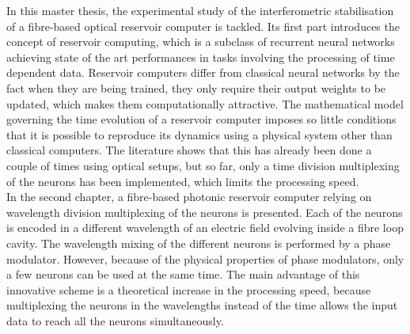 In this master thesis, the experimental study of the interferometric stabilisation of a fibre-based optical reservoir computer is tackled. Its first part introduces the concept of reservoir computing, which is a subclass of recurrent neural networks achieving state of the art performances in tasks involving the processing of time dependent data. Reservoir computers differ from classical neural networks by the fact when they are being trained, they only require their output weights to be updated, which makes them computationally attractive. The mathematical model governing the time evolution of a reservoir computer imposes so little conditions that it is possible to reproduce its dynamics using a physical system other than classical computers. The literature shows that this has already been done a couple of times using optical setups, but so far, only a time division multiplexing of the neurons has been implemented, which limits the processing speed.\\

In the second chapter, a fibre-based photonic reservoir computer relying on wavelength division multiplexing of the neurons is presented. Each of the neurons is encoded in a different wavelength of an electric field evolving inside a fibre loop cavity. The wavelength mixing of the different neurons is performed by a phase modulator. However, because of the physical properties of phase modulators, only a few neurons can be used at the same time. The main advantage of this innovative scheme is a theoretical increase in the processing speed, because multiplexing the neurons in the wavelengths instead of the time allows the input data to reach all the neurons simultaneously.\\


